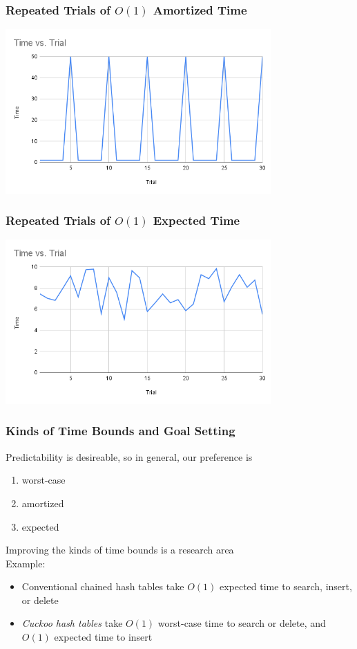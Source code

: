 \documentclass{beamer}
\begin{document}
\begin{frame} \frametitle{Repeated Trials of $O(1)$ Amortized Time}
  \includegraphics[width=4in]{LineGraphAmortized.png}
\end{frame}

\begin{frame} \frametitle{Repeated Trials of $O(1)$ Expected Time}
  \includegraphics[width=4in]{LineGraphExpected.png}
\end{frame}

\begin{frame} \frametitle{Kinds of Time Bounds and Goal Setting}
Predictability is desireable, so in general, our preference is
\begin{enumerate}
  \item worst-case
  \item amortized
  \item expected \\
\end{enumerate}


Improving the kinds of time bounds is a research area \\

Example:
\begin{itemize}
  \item Conventional chained hash tables take $O(1)$ expected time to search, insert, or delete
  \item \emph{Cuckoo hash tables} take $O(1)$ worst-case time to search or delete, and $O(1)$ expected time to insert
\end{itemize}
\end{frame}
\end{document}

